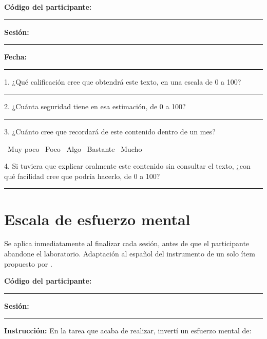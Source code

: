 \documentclass[12pt,a4paper,openany]{report}
\begin{document}
    \vspace{6pt}
    \textbf{C\'odigo del participante:} \rule{3.5cm}{0.4pt} \quad \textbf{Sesi\'on:} \rule{1.5cm}{0.4pt} \quad \textbf{Fecha:} \rule{2.5cm}{0.4pt}
    
    \vspace{10pt}
    1. ¿Qu\'e calificaci\'on cree que obtendr\'a este texto, en una escala de 0 a 100? \rule{2.5cm}{0.4pt}
    
    \vspace{8pt}
    2. ¿Cu\'anta seguridad tiene en esa estimaci\'on, de 0 a 100? \rule{2.5cm}{0.4pt}
    
    \vspace{8pt}
    3. ¿Cu\'anto cree que recordar\'a de este contenido dentro de un mes?
    
    \vspace{4pt}
    \fbox{\phantom{x}}\ Muy poco \quad \fbox{\phantom{x}}\ Poco \quad \fbox{\phantom{x}}\ Algo \quad \fbox{\phantom{x}}\ Bastante \quad \fbox{\phantom{x}}\ Mucho
    
    \vspace{8pt}
    4. Si tuviera que explicar oralmente este contenido sin consultar el texto, ¿con qu\'e facilidad cree que podr\'ia hacerlo, de 0 a 100? \rule{2.5cm}{0.4pt}
    
    \chapter{Escala de esfuerzo mental}
    \label{anx:paas}
    
    Se aplica inmediatamente al finalizar cada sesi\'on, antes de que el participante abandone el laboratorio. Adaptaci\'on al espa\~nol del instrumento de un solo \'item propuesto por \citet{paas1992training}.
    
    \vspace{10pt}
    \textbf{C\'odigo del participante:} \rule{3.5cm}{0.4pt} \quad \textbf{Sesi\'on:} \rule{1.5cm}{0.4pt}
    
    \vspace{10pt}
    \textbf{Instrucci\'on:} En la tarea que acaba de realizar, invert\'i un esfuerzo mental de:
    
\end{document}
